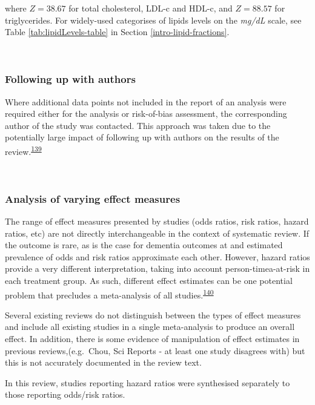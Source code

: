 \documentclass[a4paper, twoside]{templates/ociamthesis}
\begin{document}
where \(Z = 38.67\) for total cholesterol, LDL-c and HDL-c, and \(Z = 88.57\) for triglycerides. For widely-used categorises of lipids levels on the \emph{mg/dL} scale, see Table \ref{tab:lipidLevels-table} in Section \ref{intro-lipid-fractions}.

~

\hypertarget{contacting-authors}{%
\subsubsection{Following up with authors}\label{contacting-authors}}

Where additional data points not included in the report of an analysis were required either for the analysis or risk-of-bias assessment, the corresponding author of the study was contacted. This approach was taken due to the potentially large impact of following up with authors on the results of the review.\textsuperscript{\protect\hyperlink{ref-reynders2019}{139}}

~

\hypertarget{analysis-of-varying-effect-measures}{%
\subsubsection{Analysis of varying effect measures}\label{analysis-of-varying-effect-measures}}

The range of effect measures presented by studies (odds ratios, risk ratios, hazard ratios, etc) are not directly interchangeable in the context of systematic review. If the outcome is rare, as is the case for dementia outcomes at and estimated prevalence of odds and risk ratios approximate each other. However, hazard ratios provide a very different interpretation, taking into account person-timea-at-risk in each treatment group. As such, different effect estimates can be one potential problem that precludes a meta-analysis of all studies.\textsuperscript{\protect\hyperlink{ref-mckenzie2019}{140}}

Several existing reviews do not distinguish between the types of effect measures and include all existing studies in a single meta-analysis to produce an overall effect. In addition, there is some evidence of manipulation of effect estimates in previous reviews,(e.g.~Chou, Sci Reports - at least one study disagrees with) but this is not accurately documented in the review text.

In this review, studies reporting hazard ratios were synthesised separately to those reporting odds/risk ratios.
\end{document}
